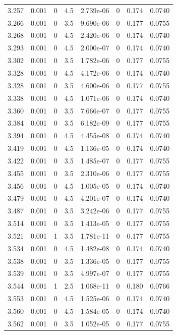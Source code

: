 \documentclass[preview]{standalone}
\begin{document}
{{{{{{{\begin{tabular}{L{1.2cm}C{1.2cm} C{0.3cm}C{0.5cm} C{1.4cm}C{1.4cm} C{1.4cm}C{1.4cm}}
  3.257  &  0.001  & 0     & 4.5 &  2.739e-06  & 0  & 0.174 &  0.0740   \\ 
  3.266  &  0.001  & 0     & 3.5 &  9.690e-06  & 0  & 0.177 &  0.0755   \\ 
  3.268  &  0.001  & 0     & 4.5 &  2.420e-06  & 0  & 0.174 &  0.0740   \\ 
  3.293  &  0.001  & 0     & 4.5 &  2.000e-07  & 0  & 0.174 &  0.0740   \\ 
  3.302  &  0.001  & 0     & 3.5 &  1.782e-06  & 0  & 0.177 &  0.0755   \\ 
  3.328  &  0.001  & 0     & 4.5 &  4.172e-06  & 0  & 0.174 &  0.0740   \\ 
  3.328  &  0.001  & 0     & 3.5 &  4.600e-06  & 0  & 0.177 &  0.0755   \\ 
  3.338  &  0.001  & 0     & 4.5 &  1.071e-06  & 0  & 0.174 &  0.0740   \\ 
  3.360  &  0.001  & 0     & 3.5 &  7.666e-07  & 0  & 0.177 &  0.0755   \\ 
  3.384  &  0.001  & 0     & 3.5 &  6.182e-09  & 0  & 0.177 &  0.0755   \\ 
  3.394  &  0.001  & 0     & 4.5 &  4.455e-08  & 0  & 0.174 &  0.0740   \\ 
  3.419  &  0.001  & 0     & 4.5 &  1.136e-05  & 0  & 0.174 &  0.0740   \\ 
  3.422  &  0.001  & 0     & 3.5 &  1.485e-07  & 0  & 0.177 &  0.0755   \\ 
  3.455  &  0.001  & 0     & 3.5 &  2.310e-06  & 0  & 0.177 &  0.0755   \\ 
  3.456  &  0.001  & 0     & 4.5 &  1.005e-05  & 0  & 0.174 &  0.0740   \\ 
  3.479  &  0.001  & 0     & 4.5 &  4.201e-07  & 0  & 0.174 &  0.0740   \\ 
  3.487  &  0.001  & 0     & 3.5 &  3.242e-06  & 0  & 0.177 &  0.0755   \\ 
  3.514  &  0.001  & 0     & 3.5 &  1.413e-05  & 0  & 0.177 &  0.0755   \\ 
  3.521  &  0.001  & 1     & 3.5 &  1.781e-11  & 0  & 0.177 &  0.0755   \\ 
  3.534  &  0.001  & 0     & 4.5 &  1.482e-08  & 0  & 0.174 &  0.0740   \\ 
  3.538  &  0.001  & 0     & 3.5 &  1.336e-05  & 0  & 0.177 &  0.0755   \\ 
  3.539  &  0.001  & 0     & 3.5 &  4.997e-07  & 0  & 0.177 &  0.0755   \\ 
  3.544  &  0.001  & 1     & 2.5 &  1.068e-11  & 0  & 0.180 &  0.0766   \\ 
  3.553  &  0.001  & 0     & 4.5 &  1.525e-06  & 0  & 0.174 &  0.0740   \\ 
  3.560  &  0.001  & 0     & 4.5 &  1.584e-05  & 0  & 0.174 &  0.0740   \\ 
  3.562  &  0.001  & 0     & 3.5 &  1.052e-05  & 0  & 0.177 &  0.0755   \\ 
\hline 
\end{tabular} 

}}}}}}}
\end{document}

